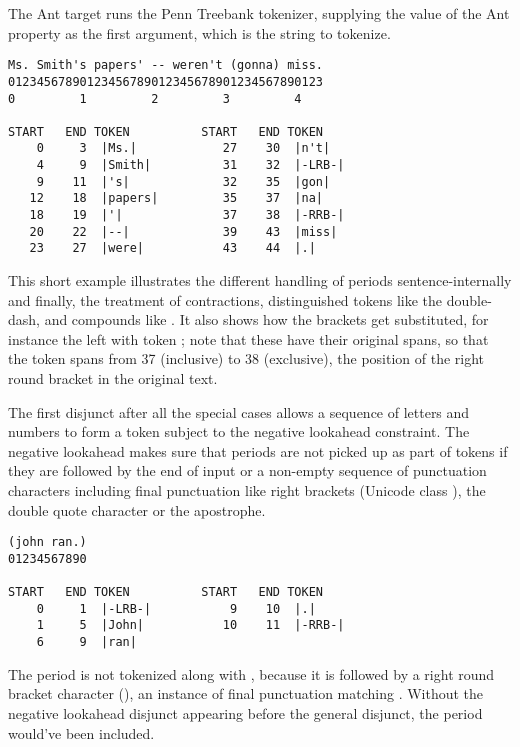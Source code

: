 The Ant target  runs the Penn Treebank tokenizer,
supplying the value of the Ant property  as the first
argument, which is the string to tokenize.
%
\begin{verbatim}
Ms. Smith's papers' -- weren't (gonna) miss.
01234567890123456789012345678901234567890123
0         1         2         3         4

START   END TOKEN          START   END TOKEN
    0     3  |Ms.|            27    30  |n't|
    4     9  |Smith|          31    32  |-LRB-|
    9    11  |'s|             32    35  |gon|
   12    18  |papers|         35    37  |na|
   18    19  |'|              37    38  |-RRB-|
   20    22  |--|             39    43  |miss|
   23    27  |were|           43    44  |.|
\end{verbatim}
%
This short example illustrates the different handling of periods
sentence-internally and finally, the treatment of contractions,
distinguished tokens like the double-dash, and compounds like
.  It also shows how the brackets get
substituted, for instance the left with token ;
note that these have their original spans, so that the
token  spans from 37 (inclusive) to 38 (exclusive),
the position of the right round bracket in the original text.

The first disjunct after all the special cases allows a sequence of
letters and numbers to form a token subject to the negative lookahead
constraint.  The negative lookahead makes sure that periods are not
picked up as part of tokens if they are followed by the end of input
or a non-empty sequence of punctuation characters including final
punctuation like right brackets (Unicode class ), the double
quote character or the apostrophe.  
%
\begin{verbatim}
(john ran.)
01234567890

START   END TOKEN          START   END TOKEN
    0     1  |-LRB-|           9    10  |.|
    1     5  |John|           10    11  |-RRB-|
    6     9  |ran|
\end{verbatim}
%
The period is not tokenized along with , because it
is followed by a right round bracket character (\charmention{)}), an
instance of final punctuation matching .  Without the
negative lookahead disjunct appearing before the general disjunct, the
period would've been included.  

